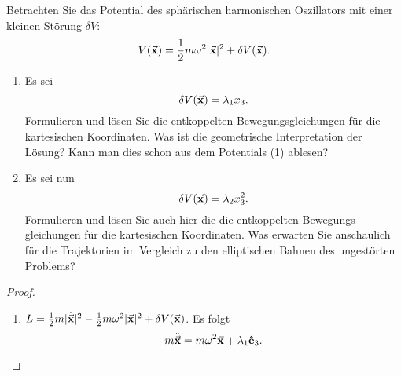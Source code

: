 \begin{Problem}
	Betrachten Sie das Potential des sphärischen harmonischen Oszillators mit einer kleinen Störung $\delta V$:
	\[
	V(\va x)=\frac{1}{2}m\omega^2|\va x|^2+\delta V(\va x)
	.\] 
	\begin{enumerate}
		\item Es sei
			 \[
			\delta V(\va x)=\lambda_1x_3
			.\] 
Formulieren und lösen Sie die entkoppelten Bewegungsgleichungen für die kartesischen Koordinaten. Was ist die geometrische Interpretation der Lösung? Kann man dies schon aus dem Potentials (1) ablesen?
\item Es sei nun
	\[
	\delta V(\va x)=\lambda_2 x_3^2
	.\] 
Formulieren und lösen Sie auch hier die die entkoppelten Bewegungs- gleichungen für die kartesischen Koordinaten. Was erwarten Sie anschaulich für die Trajektorien im Vergleich zu den elliptischen Bahnen des ungestörten Problems?
	\end{enumerate}
\end{Problem}

\begin{proof}
	\begin{enumerate}
		\item $L=\frac{1}{2}m|\dot{\va x}|^2-\frac{1}{2}m\omega^2|\va x|^2+\delta V(\va x)$. Es folgt
\[
	m\ddot{\va x}=m\omega^2\va x+\lambda_1\vu{e}_3
.\] 
	\end{enumerate}
\end{proof}
